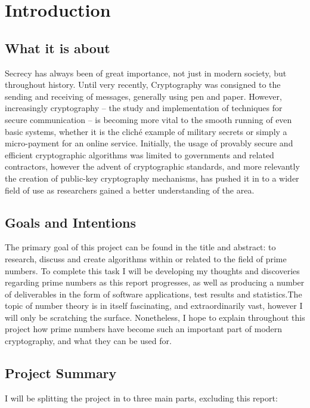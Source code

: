 \chapter{Introduction}
\label{Chapter1}

\section{What it is about}

Secrecy has always been of great importance, not just in modern society, but throughout history. Until very recently, Cryptography was consigned to the sending and receiving of messages, generally using pen and paper. However, increasingly cryptography -- the study and implementation of techniques for secure communication -- is becoming more vital to the smooth running of even basic systems, whether it is the clich\'{e} example of military secrets or simply a micro-payment for an online service. Initially, the usage of provably secure and efficient cryptographic algorithms was limited to governments and related contractors, however the advent of cryptographic standards, and more relevantly the creation of public-key cryptography mechanisms, has pushed it in to a wider field of use as researchers gained a better understanding of the area. 

\section{Goals and Intentions}

The primary goal of this project can be found in the title and abstract: to research, discuss and create algorithms within or related to the field of prime numbers. To complete this task I will be developing my thoughts and discoveries regarding prime numbers as this report progresses, as well as producing a number of deliverables in the form of software applications, test results and statistics.The topic of number theory is in itself fascinating, and extraordinarily vast, however I will only be scratching the surface. Nonetheless, I hope to explain throughout this project how prime numbers have become such an important part of modern cryptography, and what they can be used for.

\section{Project Summary}

I will be splitting the project in to three main parts, excluding this report:

